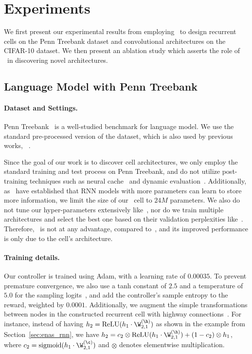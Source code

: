 \section{\label{sec:exp}Experiments}
We first present our experimental results from employing \enas~to design recurrent cells on the Penn Treebank dataset and convolutional architectures on the CIFAR-10 dataset. We then present an ablation study which asserts the role of \enas~in discovering novel architectures.

\subsection{\label{sec:ptb}Language Model with Penn Treebank}
\paragraph{Dataset and Settings.} Penn Treebank~\citep{penntreebank} is a well-studied benchmark for language model. We use the standard pre-processed version of the dataset, which is also used by previous works, \eg~\citet{rnn_regularization}.

Since the goal of our work is to discover cell architectures, we only employ the standard training and test process on Penn Treebank, and do not utilize post-training techniques such as neural cache~\citep{neural_cache} and dynamic evaluation~\citep{ptb_dynamic_eval}. Additionally, as~\citet{rnn_params_count} have established that RNN models with more parameters can learn to store more information, we limit the size of our \enas~cell to $24M$ parameters. We also do not tune our hyper-parameters extensively like~\citet{ptb_hparams}, nor do we train multiple architectures and select the best one based on their validation perplexities like~\citet{nas}. Therefore, \enas~is not at any advantage, compared to~\citet{nas,mos,ptb_hparams}, and its improved performance is only due to the cell's architecture.

\paragraph{Training details.} Our controller is trained using Adam, with a learning rate of $0.00035$. To prevent premature convergence, we also use a tanh constant of $2.5$ and a temperature of $5.0$ for the sampling logits~\citep{neural_combi,neural_optimizer_search}, and add the controller's sample entropy to the reward, weighted by $0.0001$. Additionally, we augment the simple transformations between nodes in the constructed recurrent cell with highway connections~\citep{rhn}. For instance, instead of having $h_2 =\text{ReLU}(h_1 \cdot \W^{(\h)}_{2, 1})$ as shown in the example from Section~\ref{sec:enas_rnn}, we have $h_2 = c_2 \otimes \text{ReLU}(h_1 \cdot \W^{(\h)}_{2, 1}) + (1 - c_2) \otimes h_1$, where $c_2 = \text{sigmoid}(h_1 \cdot \W^{(\c)}_{2, 1})$ and $\otimes$ denotes elementwise multiplication.

